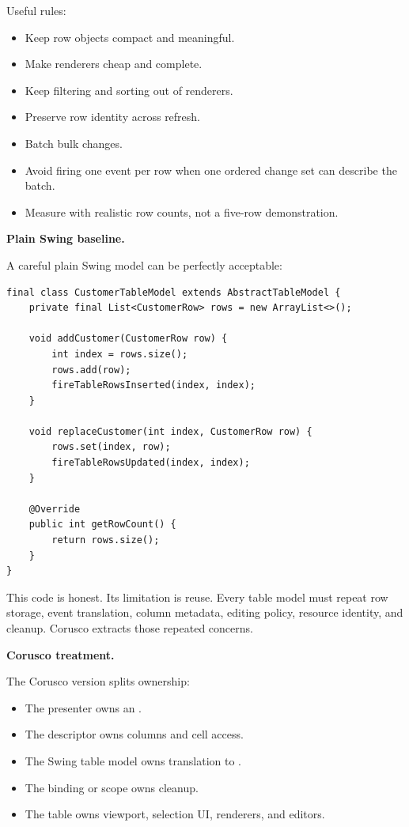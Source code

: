 Useful rules:

\begin{itemize}
\item Keep row objects compact and meaningful.
\item Make renderers cheap and complete.
\item Keep filtering and sorting out of renderers.
\item Preserve row identity across refresh.
\item Batch bulk changes.
\item Avoid firing one event per row when one ordered change set can describe
the batch.
\item Measure with realistic row counts, not a five-row demonstration.
\end{itemize}

\textbf{Plain Swing baseline.}

A careful plain Swing model can be perfectly acceptable:

\begin{lstlisting}[caption={Handwritten precise table model.}]
final class CustomerTableModel extends AbstractTableModel {
    private final List<CustomerRow> rows = new ArrayList<>();

    void addCustomer(CustomerRow row) {
        int index = rows.size();
        rows.add(row);
        fireTableRowsInserted(index, index);
    }

    void replaceCustomer(int index, CustomerRow row) {
        rows.set(index, row);
        fireTableRowsUpdated(index, index);
    }

    @Override
    public int getRowCount() {
        return rows.size();
    }
}
\end{lstlisting}

This code is honest. Its limitation is reuse. Every table model must repeat row
storage, event translation, column metadata, editing policy, resource identity,
and cleanup. Corusco extracts those repeated concerns.

\textbf{Corusco treatment.}

The Corusco version splits ownership:

\begin{itemize}
\item The presenter owns an .
\item The descriptor owns columns and cell access.
\item The Swing table model owns translation to .
\item The binding or scope owns cleanup.
\item The table owns viewport, selection UI, renderers, and editors.
\end{itemize}

